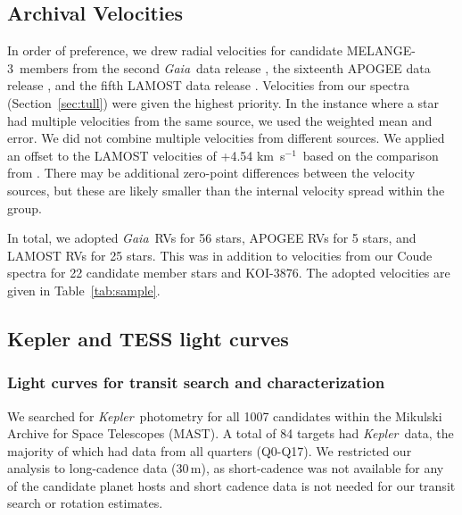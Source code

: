\documentclass[twocolumn, linenumbers]{aastex631}
\newcommand{\association}{MELANGE-3}
\newcommand{\starname}{KOI-3876}
\newcommand{\kepler}{{\it Kepler}}
\newcommand\kms{km~s$^{-1}$}
\newcommand{\tess}{\textit{TESS}}
\newcommand{\gaia}{\textit{Gaia}}
\begin{document}
\subsection{Archival Velocities}\label{sec:archRVs}
In order of preference, we drew radial velocities for candidate \association\ members from the second \gaia\ data release \citep[DR2;][]{DR2_velocities}, the sixteenth APOGEE data release \citep[DR16; ][]{2020AJ....160..120J}, and the fifth LAMOST data release \cite[DR5; ][]{2015RAA....15.1095L, 2019yCat.5164....0L}. Velocities from our spectra (Section~\ref{sec:tull}) were given the highest priority. In the instance where a star had multiple velocities from the same source, we used the weighted mean and error. We did not combine multiple velocities from different sources. We applied an offset to the LAMOST velocities of +4.54 \kms\ based on the comparison from \citet{2018A&A...620A..76A}. There may be additional zero-point differences between the velocity sources, but these are likely smaller than the internal velocity spread within the group. 

In total, we adopted \gaia\ RVs for 56 stars, APOGEE RVs for 5 stars, and LAMOST RVs for 25 stars. This was in addition to velocities from our Coude spectra for 22 candidate member stars and \starname. The adopted velocities are given in Table~\ref{tab:sample}.

\subsection{Kepler and TESS light curves}\label{sec:lc}

\subsubsection{Light curves for transit search and characterization}

We searched for \kepler\ photometry for all 1007 candidates within the Mikulski Archive for Space Telescopes (MAST). A total of 84 targets had \kepler\ data, the majority of which had data from all quarters (Q0-Q17). We restricted our analysis to long-cadence data (30\,m), as short-cadence was not available for any of the candidate planet hosts and short cadence data is not needed for our transit search or rotation estimates. %
\end{document}
